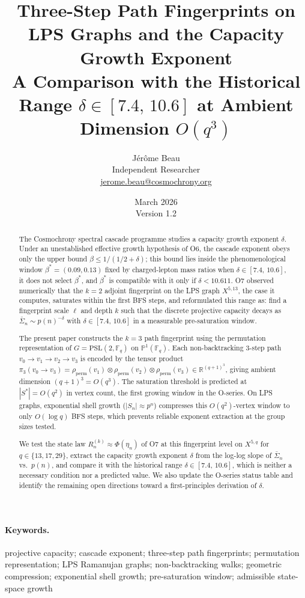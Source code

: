 \documentclass[11pt,a4paper]{article}
\title{\textbf{Three-Step Path Fingerprints on LPS Graphs and the Capacity Growth Exponent}\\[6pt]
\large A Comparison with the Historical Range $\delta \in [7.4,\,10.6]$ at Ambient Dimension $O(q^3)$}
\author{J\'{e}r\^{o}me Beau\\
\small Independent Researcher\\
\small \href{mailto:jerome.beau@cosmochrony.org}{jerome.beau@cosmochrony.org}}
\date{March 2026\\[2pt]\small Version 1.2}
\theoremstyle{definition}
\theoremstyle{remark}
\newcommand{\R}{\mathbb{R}}
\newcommand{\F}{\mathbb{F}}
\newcommand{\Proj}{\mathbb{P}}
\newcommand{\bSigma}{\bar{\Sigma}}
\newcommand{\Rn}{R_n^{(k)}}
\newcommand{\etan}{\eta_n}
\newcommand{\PSL}{\mathrm{PSL}}
\newcommand{\perm}{\mathrm{perm}}
\begin{document}
  \maketitle

  \begin{abstract}
    The Cosmochrony spectral cascade programme studies a capacity growth exponent $\delta$.
    Under an unestablished effective growth hypothesis of O6, the cascade exponent obeys only the
    upper bound $\beta \leq 1/(1/2+\delta)$; this bound lies inside the phenomenological window
    $\beta^* = (0.09, 0.13)$ fixed by charged-lepton mass ratios when $\delta \in [7.4,\,10.6]$, it does
    not select $\beta^*$, and $\beta^*$ is compatible with it only if $\delta < 10.611$.
    O7 observed numerically that the $k = 2$ adjoint fingerprint on the LPS graph $X^{5,13}$, the
    case it computes, saturates within the first BFS steps, and reformulated this range as: find a fingerprint scale $\ell$
    and depth $k$ such that the discrete projective capacity decays as
    $\bSigma_n \sim p(n)^{-\delta}$ with $\delta \in [7.4,\,10.6]$ in a measurable
    pre-saturation window.

    The present paper constructs the $k = 3$ path fingerprint using the permutation
    representation of $G = \PSL(2, \F_q)$ on $\Proj^1(\F_q)$.
    Each non-backtracking 3-step path $v_0 \to v_1 \to v_2 \to v_3$ is encoded by the
    tensor product $\pi_3(v_0 \to v_3) = \rho_\perm(v_1) \otimes \rho_\perm(v_2)
    \otimes \rho_\perm(v_3) \in \R^{(q+1)^3}$, giving ambient dimension $(q+1)^3 = O(q^3)$.
    The saturation threshold is predicted at $|S^*| = O(q^2)$ in vertex count,
    the first growing window in the O-series.
    On LPS graphs, exponential shell growth ($|S_n| \approx p^n$) compresses this
    $O(q^2)$-vertex window to only $O(\log q)$ BFS steps, which prevents reliable
    exponent extraction at the group sizes tested.

    We test the state law $\Rn \approx \Phi(\etan)$ of O7 at this fingerprint level on
    $X^{5,q}$ for $q \in \{13, 17, 29\}$, extract the capacity growth exponent $\delta$
    from the log-log slope of $\bSigma_n$ vs.\ $p(n)$, and compare it with the historical range
    $\delta \in [7.4,\,10.6]$, which is neither a necessary condition nor a predicted value.
    We also update the O-series status table and identify the remaining open directions
    toward a first-principles derivation of $\delta$.
  \end{abstract}

  \paragraph{Keywords.}
    projective capacity; cascade exponent; three-step path fingerprints; permutation representation; LPS Ramanujan
    graphs; non-backtracking walks; geometric compression; exponential shell growth; pre-saturation window; admissible
    state-space growth
\end{document}
